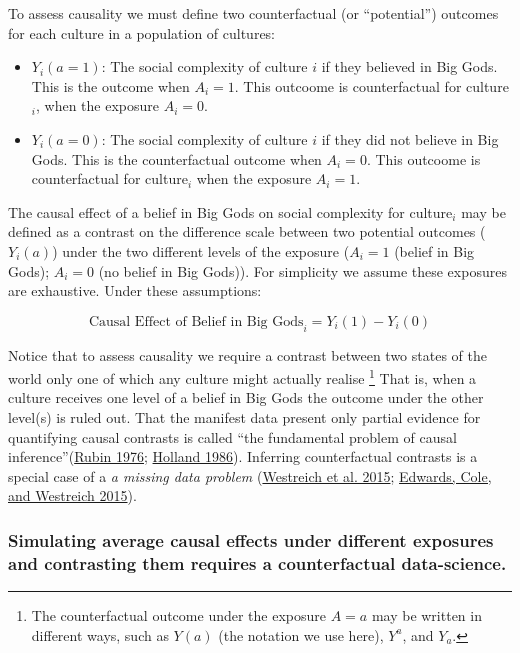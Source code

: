\documentclass[
  singlecolumn]{report}
\providecommand{\tightlist}{%
  \setlength{\itemsep}{0pt}\setlength{\parskip}{0pt}}\usepackage{longtable,booktabs,array}
\begin{document}
To assess causality we must define two counterfactual (or ``potential'')
outcomes for each culture in a population of cultures:

\begin{itemize}
\tightlist
\item
  \(Y_i(a = 1)\): The social complexity of culture \(i\) if they
  believed in Big Gods. This is the outcome when \(A_i = 1\). This
  outcoome is counterfactual for culture\(_i\), when the exposure
  \(A_i = 0\).
\item
  \(Y_i(a = 0)\): The social complexity of culture \(i\) if they did not
  believe in Big Gods. This is the counterfactual outcome when
  \(A_i = 0\). This outcoome is counterfactual for culture\(_i\) when
  the exposure \(A_i = 1\).
\end{itemize}

The causal effect of a belief in Big Gods on social complexity for
culture\(_i\) may be defined as a contrast on the difference scale
between two potential outcomes (\(Y_i(a)\)) under the two different
levels of the exposure (\(A_i = 1\) (belief in Big Gods); \(A_i = 0\)
(no belief in Big Gods)). For simplicity we assume these exposures are
exhaustive. Under these assumptions:

\[
\text{Causal Effect of Belief in Big Gods}_i = Y_i(1) - Y_i(0) 
\]

Notice that to assess causality we require a contrast between two states
of the world only one of which any culture might actually realise
\footnote{The counterfactual outcome under the exposure \(A = a\) may be
  written in different ways, such as \(Y(a)\) (the notation we use
  here), \(Y^{a}\), and \(Y_a\).} That is, when a culture receives one
level of a belief in Big Gods the outcome under the other level(s) is
ruled out. That the manifest data present only partial evidence for
quantifying causal contrasts is called ``the fundamental problem of
causal inference''(\protect\hyperlink{ref-rubin1976}{Rubin 1976};
\protect\hyperlink{ref-holland1986}{Holland 1986}). Inferring
counterfactual contrasts is a special case of a \emph{a missing data
problem} (\protect\hyperlink{ref-westreich2015}{Westreich et al. 2015};
\protect\hyperlink{ref-edwards2015}{Edwards, Cole, and Westreich 2015}).

\hypertarget{simulating-average-causal-effects-under-different-exposures-and-contrasting-them-requires-a-counterfactual-data-science.}{%
\subsubsection{Simulating average causal effects under different
exposures and contrasting them requires a counterfactual
data-science.}\label{simulating-average-causal-effects-under-different-exposures-and-contrasting-them-requires-a-counterfactual-data-science.}}
\end{document}
